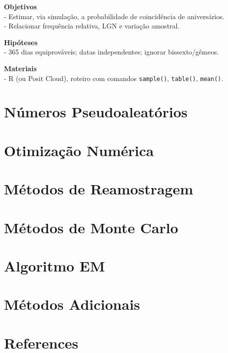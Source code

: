 \documentclass[
  letterpaper,
  DIV=11,
  numbers=noendperiod]{scrreprt}
\newlength{\cslhangindent}
\newenvironment{CSLReferences}[2] %
 {\begin{list}{}{%
  \setlength{\itemindent}{0pt}
  \setlength{\leftmargin}{0pt}
  \setlength{\parsep}{0pt}
  \ifodd #1
   \setlength{\leftmargin}{\cslhangindent}
   \setlength{\itemindent}{-1\cslhangindent}
  \fi
  \setlength{\itemsep}{#2\baselineskip}}}
 {\end{list}}
\begin{document}
\textbf{Objetivos}\\
- Estimar, via simulação, a probabilidade de coincidência de
aniversários.\\
- Relacionar frequência relativa, LGN e variação amostral.

\textbf{Hipóteses}\\
- 365 dias equiprováveis; datas independentes; ignorar bissexto/gêmeos.

\textbf{Materiais}\\
- R (ou Posit Cloud), roteiro com comandos \texttt{sample()},
\texttt{table()}, \texttt{mean()}.


\chapter{Números Pseudoaleatórios}\label{nuxfameros-pseudoaleatuxf3rios}


\chapter{Otimização Numérica}\label{otimizauxe7uxe3o-numuxe9rica}


\chapter{Métodos de Reamostragem}\label{muxe9todos-de-reamostragem}


\chapter{Métodos de Monte Carlo}\label{muxe9todos-de-monte-carlo}


\chapter{Algoritmo EM}\label{algoritmo-em}


\chapter{Métodos Adicionais}\label{muxe9todos-adicionais}


\chapter*{References}\label{references}


\label{refs}
\begin{CSLReferences}{0}{1}
\end{CSLReferences}
\end{document}
